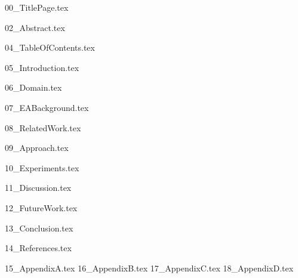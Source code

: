 \documentclass[version=last, pagesize=auto, paper=a4]{report}%
\numberwithin{equation}{section}
\begin{document}

		
\renewcommand{\baselinestretch}{1.0}\normalsize
{00_TitlePage.tex}
\renewcommand{\baselinestretch}{1.3}\normalsize


{02_Abstract.tex}


\renewcommand{\baselinestretch}{1.0}\normalsize
{04_TableOfContents.tex}
\renewcommand{\baselinestretch}{1.3}\normalsize

{05_Introduction.tex}

{06_Domain.tex}

{07_EABackground.tex}

{08_RelatedWork.tex}

{09_Approach.tex}

{10_Experiments.tex}

{11_Discussion.tex}

{12_FutureWork.tex}

{13_Conclusion.tex}

{14_References.tex}

\newpage
\begin{appendices}
    {15_AppendixA.tex}
    {16_AppendixB.tex}
    {17_AppendixC.tex}
    {18_AppendixD.tex}
\end{appendices}

\newpage
\setcounter{tocdepth}{1}
\listoftodos
\end{document}

